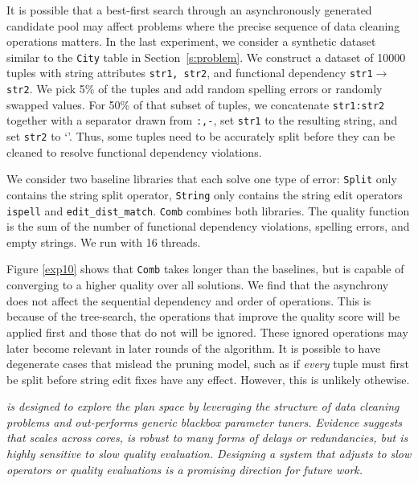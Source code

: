 It is possible that a best-first search through an asynchronously generated candidate pool may affect problems where the precise sequence of data cleaning operations matters.
In the last experiment, we consider a synthetic dataset similar to the \texttt{City} table in Section~\ref{s:problem}.  
We construct a dataset of 10000 tuples with string attributes \texttt{str1, str2}, and functional dependency \texttt{str1$\rightarrow$str2}.  We pick 5\% of the tuples and add random spelling errors or randomly swapped values. For 50\% of that subset of tuples, we concatenate \texttt{str1:str2} together with a separator drawn from \texttt{:,-}, set \texttt{str1} to the resulting string, and set \texttt{str2} to `'.  Thus, some tuples need to be accurately split before they can be cleaned to resolve functional dependency violations.

We consider two baseline libraries that each solve one type of error: \texttt{Split} only contains the string split operator, \texttt{String} only contains the string edit operators \texttt{ispell} and \texttt{edit\_dist\_match}.  \texttt{Comb} combines both libraries.  The quality function is the sum of the number of functional dependency violations, spelling errors, and empty strings.  We run \sys with 16 threads.

Figure \ref{exp10} shows that \texttt{Comb} takes longer than the baselines, but is capable of converging to a higher quality over all solutions.
We find that the asynchrony does not affect the sequential dependency and order of operations.
This is because of the tree-search, the operations that improve the quality score will be applied first and those that do not will be ignored.
These ignored operations may later become relevant in later rounds of the algorithm.  It is possible to have degenerate cases that mislead the pruning model, such as if {\it every} tuple must first be split before string edit fixes have any effect.  However, this is unlikely othewise.

{\it {} \sys is designed to explore the plan space by leveraging the structure of data cleaning problems and out-performs generic blackbox parameter tuners.  Evidence suggests that \sys scales across cores, is robust to many forms of delays or redundancies, but is highly sensitive to slow quality evaluation.  Designing a system that adjusts to slow operators or quality evaluations is a promising direction for future work.}

